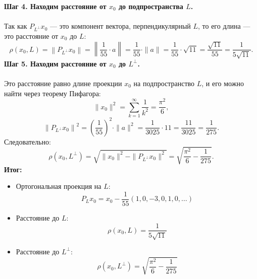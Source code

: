 \documentclass{article}
\begin{document}
\vspace{0.7em}
\textbf{Шаг 4. Находим расстояние от \(x_0\) до подпространства \(L\).} \\ \\
Так как $P_{L^\perp} x_0$ — это компонент вектора, перпендикулярный $L$, то его длина — это расстояние от $x_0$ до $L$:
\[
\rho(x_0, L) = \left\| P_{L^\perp} x_0 \right\| = \left\| \frac{1}{55} \cdot a \right\| = \frac{1}{55} \cdot \|a\| = \frac{1}{55} \cdot \sqrt{11} = \frac{\sqrt{11}}{55} = \frac{1}{5\sqrt{11}}.
\]
\vspace{0.7em}
\textbf{Шаг 5. Находим расстояние от \(x_0\) до \(L^\perp\).} \\ \\
Это расстояние равно длине проекции $x_0$ на подпространство $L$, и его можно найти через теорему Пифагора:
\[
\|x_0\|^2 = \sum_{k=1}^{\infty} \frac{1}{k^2} = \frac{\pi^2}{6},
\]
\[
\left\| P_{L^\perp} x_0 \right\|^2 = \left( \frac{1}{55} \right)^2 \cdot \|a\|^2 = \frac{1}{3025} \cdot 11 = \frac{11}{3025} = \frac{1}{275}.
\]
Следовательно:
\[
\rho(x_0, L^\perp) = \sqrt{ \|x_0\|^2 - \|P_{L^\perp} x_0\|^2 } = \sqrt{ \frac{\pi^2}{6} - \frac{1}{275} }.
\]
\vspace{1em}
\textbf{Итог:}
\begin{itemize}
    \item Ортогональная проекция на $L$:
    \[
    P_L x_0 = x_0 - \frac{1}{55}(1, 0, -3, 0, 1, 0, \dots)
    \]
    \item Расстояние до $L$:
    \[
    \rho(x_0, L) = \frac{1}{5\sqrt{11}}
    \]
    \item Расстояние до $L^\perp$:
    \[
    \rho(x_0, L^\perp) = \sqrt{ \frac{\pi^2}{6} - \frac{1}{275} }
    \]
\end{itemize}
\end{document}
